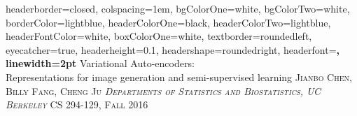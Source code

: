 \documentclass[portrait,fontscale=0.40,paperwidth=30in, paperheight=40in,margin=1in]{baposter} %
\theoremstyle{definition}
\theoremstyle{remark}
\begin{document}
\begin{poster}
{
headerborder=closed, %
colspacing=1em, %
bgColorOne=white, %
bgColorTwo=white, %
borderColor=lightblue, %
headerColorOne=black, %
headerColorTwo=lightblue, %
headerFontColor=white, %
boxColorOne=white, %
textborder=roundedleft, %
eyecatcher=true, %
headerheight=0.1\textheight, %
headershape=roundedright, %
headerfont=\large\bf\textsc, %
linewidth=2pt %
}
%
{
} %
{
{Variational Auto-encoders:\\Representations for image generation and semi-supervised learning}
\vspace{0.5em}
} %
{\textsc{Jianbo Chen, Billy Fang, Cheng Ju
\hspace{12pt}
\textit{Departments of Statistics and Biostatistics, UC Berkeley}
\hspace{12pt} CS 294-129, Fall 2016
}} %




\end{poster}
\end{document}
